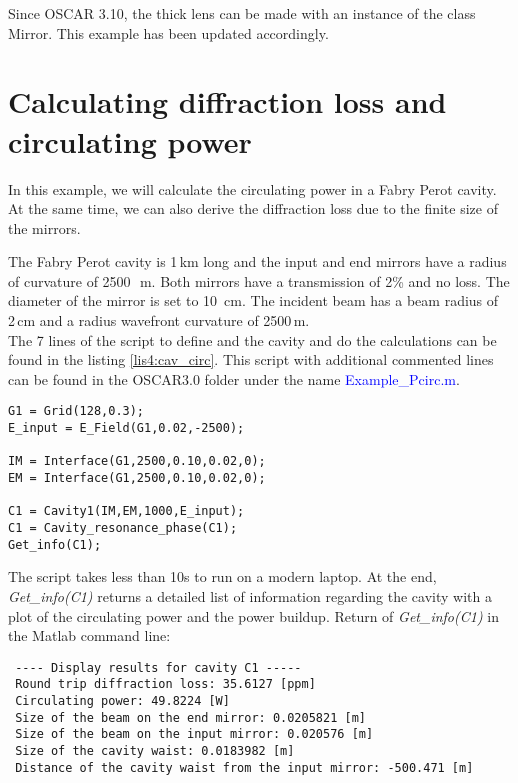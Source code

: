 Since OSCAR 3.10, the thick lens can be made with an instance of the class Mirror. This example has been updated accordingly.

\section{Calculating diffraction loss and circulating power}

In this example, we will calculate the circulating power in a Fabry Perot cavity. At the same time, we can also derive the diffraction loss due to the finite size of the mirrors.

The Fabry Perot cavity is 1\,km long and the input and end mirrors have a radius of curvature of 2500~\,m. Both mirrors have a transmission of 2\% and no loss. The diameter of the mirror is set to 10~cm. The incident beam has a beam radius of 2\,cm and a radius wavefront curvature of 2500\,m.\\

The 7 lines of the script to define and the cavity and do the calculations can be found in the listing \ref{lis4:cav_circ}. This script with additional commented lines can be found in the OSCAR3.0 folder under the name \textcolor{blue}{Example\_Pcirc.m}.

\begin{lstlisting}[float=htp,caption=Example of OSCAR script to calculate the circulating power\label{lis4:cav_circ},frame=lines]
G1 = Grid(128,0.3);
E_input = E_Field(G1,0.02,-2500);

IM = Interface(G1,2500,0.10,0.02,0);
EM = Interface(G1,2500,0.10,0.02,0);

C1 = Cavity1(IM,EM,1000,E_input);
C1 = Cavity_resonance_phase(C1);
Get_info(C1);
\end{lstlisting}

The script takes less than 10s to run on a modern laptop. At the end, \emph{Get\_info(C1)} returns a detailed list of information regarding the cavity with a plot of the circulating power and the power buildup. Return of \emph{Get\_info(C1)} in the Matlab command line:

\newpage

\begin{verbatim}
 ---- Display results for cavity C1 -----
 Round trip diffraction loss: 35.6127 [ppm]
 Circulating power: 49.8224 [W]
 Size of the beam on the end mirror: 0.0205821 [m]
 Size of the beam on the input mirror: 0.020576 [m]
 Size of the cavity waist: 0.0183982 [m]
 Distance of the cavity waist from the input mirror: -500.471 [m]
\end{verbatim}

